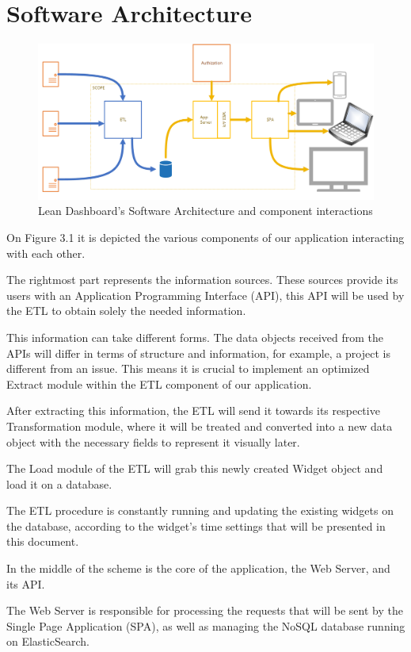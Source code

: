\documentclass[a4paper,twoside,10pt]{report}
\begin{document}
\section{Software Architecture}
\begin{figure}[h!]
\center
    \includegraphics[width=\textwidth]{lean-dashboard-software-architecture.png}
    \caption{Lean Dashboard's Software Architecture and component interactions}
\end{figure}
On Figure 3.1 it is depicted the various components of our application interacting with each other.

The rightmost part represents the information sources. These sources provide its users with an Application Programming Interface (API), this API will be used by the  ETL to obtain solely the needed information.

This information can take different forms. The data objects received from the APIs will differ in terms of structure and information, for example, a project is different from an issue. This means it is crucial to implement an optimized Extract module within the ETL component of our application.

After extracting this information, the ETL will send it towards its respective Transformation module, where it will be treated and converted into a new data object with the necessary fields to represent it visually later.

The Load module of the ETL will grab this newly created Widget object and load it on a database.

The ETL procedure is constantly running and updating the existing widgets on the database, according to the widget's time settings that will be presented in this document.

In the middle of the scheme is the core of the application, the Web Server, and its API.

The Web Server is responsible for processing the requests that will be sent by the Single Page Application (SPA), as well as managing the NoSQL database running on ElasticSearch\cite{ES}.
\end{document}
